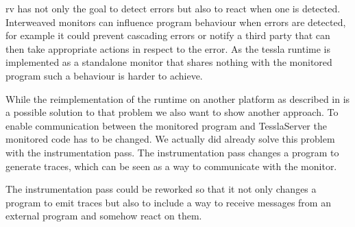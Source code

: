 \Gls{rv} has not only the goal to detect errors but also to react when one is detected.
Interweaved monitors can influence program behaviour when errors are detected, for example it could prevent cascading errors or notify a third party that can then take appropriate actions in respect to the error.
As the \gls{tessla} runtime is implemented as a standalone monitor that shares nothing with the monitored program such a behaviour is harder to achieve.

While the reimplementation of the runtime on another platform as described in  is a possible solution to that problem we also want to show another approach.
To enable communication between the monitored program and TesslaServer the monitored code has to be changed.
We actually did already solve this problem with the instrumentation pass.
The instrumentation pass changes a program to generate traces, which can be seen as a way to communicate with the monitor.

The instrumentation pass could be reworked so that it not only changes a program to emit traces but also to include a way to receive messages from an external program and somehow react on them.

